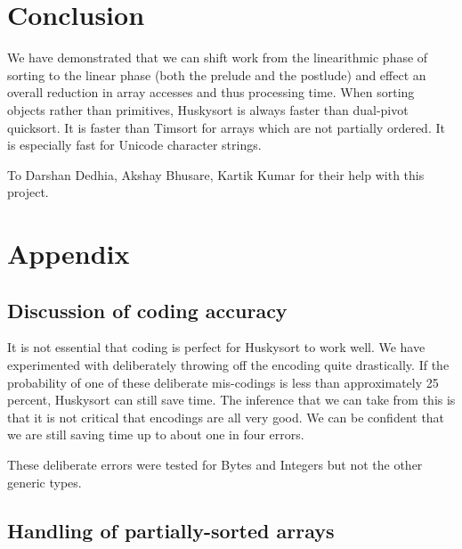 \documentclass[acmtog]{acmart}
\begin{document}
\section{Conclusion}

We have demonstrated that we can shift work from the linearithmic phase of sorting to the linear phase (both the prelude and the postlude) and effect an overall reduction in array accesses and thus processing time.
When sorting objects rather than primitives, Huskysort is always faster than dual-pivot quicksort.
It is faster than Timsort for arrays which are not partially ordered.
It is especially fast for Unicode character strings.

\begin{acks}
To Darshan Dedhia, Akshay Bhusare, Kartik Kumar for their help with this project.
\end{acks}






\appendix
\section{Appendix}
\subsection{Discussion of coding accuracy}
It is not essential that coding is perfect for Huskysort to work well.
We have experimented with deliberately throwing off the encoding quite drastically.
If the probability of one of these deliberate mis-codings is less than approximately 25 percent, Huskysort can still save time.
The inference that we can take from this is that it is not critical that encodings are all very good.
We can be confident that we are still saving time up to about one in four errors.

These deliberate errors were tested for Bytes and Integers but not the other generic types.

\subsection{Handling of partially-sorted arrays}
\end{document}
